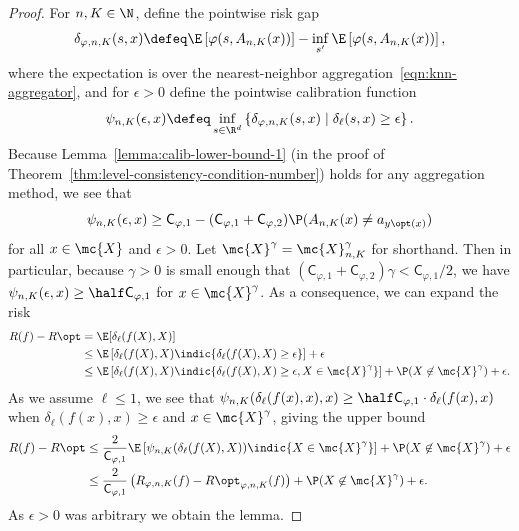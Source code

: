 \documentclass[11pt]{article}
\newcommand{\constant}{\mathsf{C}}  %
\newcommand{\tloss}{\ell}  %
\newcommand{\sloss}{\varphi}  %
\newcommand{\extloss}{\delta_\tloss}
\newcommand{\knnriskgap}{\delta_{\sloss,n,K}}  %
\begin{document}
\begin{proof}
  For $n, K \in \N$, define the pointwise risk gap
  \begin{equation*}
    \knnriskgap(s, x)
    \defeq \E\left[\sloss(s, A_{n,K}(x))\right]
    - \inf_{s'} \E\left[\sloss(s, A_{n,K}(x))\right],
  \end{equation*}
  where the expectation is over the nearest-neighbor
  aggregation~\eqref{eqn:knn-aggregator}, and for $\epsilon > 0$ define the
  pointwise calibration function
  \begin{equation*}
    \psi_{n,K}(\epsilon, x)
    \defeq \inf_{s \in \R^d}
    \left\{\knnriskgap(s, x) \mid \extloss(s, x) \ge \epsilon \right\}.
  \end{equation*}
  Because Lemma~\ref{lemma:calib-lower-bound-1} (in the proof of
  Theorem~\ref{thm:level-consistency-condition-number}) holds for any
  aggregation method, we see that
  \begin{equation*}
    \psi_{n,K}(\epsilon, x)
    \ge \constant_{\sloss,1}
    - (\constant_{\sloss,1} + \constant_{\sloss, 2}) \P(A_{n,K}(x) \neq a_{y\opt(x)})
  \end{equation*}
  for all $x \in \mc{X}$ and $\epsilon > 0$.
  Let $\mc{X}^\gamma = \mc{X}^\gamma_{n,K}$ for shorthand.
  Then in particular, because $\gamma > 0$ is small enough that
  $(\constant_{\sloss,1} + \constant_{\sloss,2}) \gamma < \constant_{\sloss,
    1} / 2$, we have $\psi_{n,K}(\epsilon, x) \ge \half \constant_{\sloss,1}$
  for $x \in \mc{X}^\gamma$.
  As a consequence, we can expand the risk
  \begin{align*}
    R(f) - R\opt
    & = \E[\extloss(f(X), X)] \\
    & \le \E\left[\extloss(f(X), X) \indic{\extloss(f(X), X) \ge \epsilon}\right]
    + \epsilon \\
    & \le \E\left[\extloss(f(X), X)
      \indic{\extloss(f(X), X) \ge \epsilon,
        X \in \mc{X}^\gamma}\right]
    + \P(X \not \in \mc{X}^\gamma)
    + \epsilon.
  \end{align*}
  As we assume $\tloss \le 1$, we see that
  $\psi_{n,K}(\extloss(f(x), x), x)
  \ge \half \constant_{\sloss,1} \cdot \extloss(f(x), x)$ when
  $\extloss(f(x), x) \ge \epsilon$
  and $x \in \mc{X}^\gamma$, giving the upper bound
  \begin{align*}
    R(f) - R\opt
    & \le \frac{2}{\constant_{\sloss,1}}
    \E\left[
      \psi_{n,K}(\extloss(f(X), X))
      \indic{X \in \mc{X}^\gamma}
      \right]
    + \P(X \not \in \mc{X}^\gamma)
    + \epsilon \\
    & \le \frac{2}{\constant_{\sloss,1}} \left(R_{\sloss,n,K}(f)
    - R\opt_{\sloss,n,K}(f)\right)
    + \P(X \not \in \mc{X}^\gamma) + \epsilon.
  \end{align*}
  As $\epsilon > 0$ was arbitrary we obtain the lemma.
\end{proof}
\end{document}
